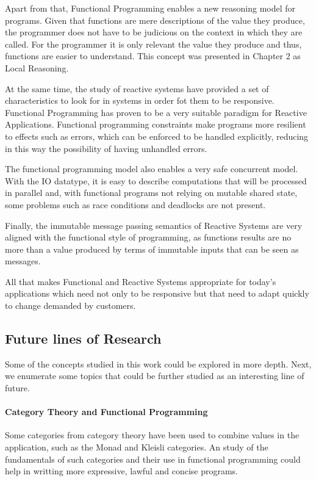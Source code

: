 \documentclass[../main.tex]{subfiles}
\begin{document}
Apart from that, Functional Programming enables a new reasoning model for
programs. Given that functions are mere descriptions of the value they produce,
the programmer does not have to be judicious on the context in which they are
called. For the programmer it is only relevant the value they produce and thus,
functions are easier to understand. This concept was presented in Chapter 2 as
Local Reasoning.

At the same time, the study of reactive systems have provided a set of
characteristics to look for in systems in order fot them to be responsive. Functional Programming
has proven to be a very suitable paradigm for Reactive Applications. Functional programming
constraints make programs more resilient to effects
such as errors, which can be enforced to be handled explicitly, reducing in this way
the possibility of having unhandled errors.

The functional programming model also enables a very safe concurrent
model. With the IO datatype, it is easy to describe computations that will be
processed in parallel and, with functional programs not relying on mutable shared
state, some problems such as race conditions and deadlocks are not present.

Finally, the immutable message passing semantics of Reactive Systems are very
aligned with the functional style of programming, as functions results are no more than
a value produced by terms of immutable inputs that can be seen as messages.

All that makes Functional and Reactive Systems appropriate for today's
applications which need not only to be responsive but that need to adapt quickly
to change demanded by customers.

\subsection{Future lines of Research}
Some of the concepts studied in this work could be explored in more depth. Next, we enumerate 
some topics that could be further studied as an interesting line of future.

\paragraph{Category Theory and Functional Programming}

Some categories from category theory have been used to combine values in the
application, such as the Monad and Kleisli categories. An study of the
fundamentals of such categories and their use in functional programming could
help in writting more expressive, lawful and concise programs.
\end{document}
